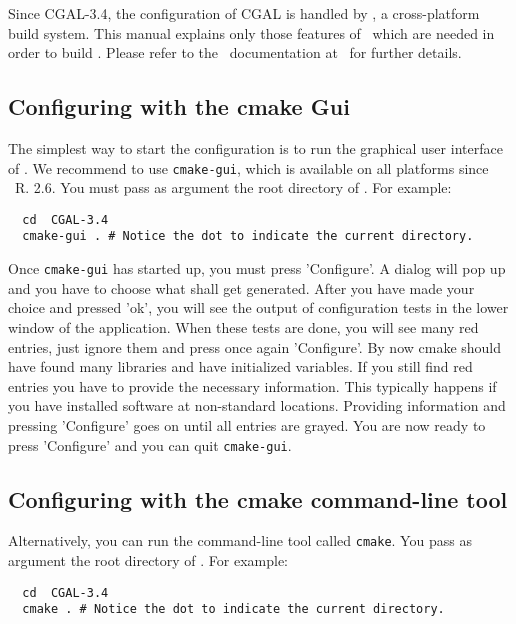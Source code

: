 Since CGAL-3.4, the configuration of CGAL is handled by \cmake, a
cross-platform build system.  This manual explains only those features of
\cmake\ which are needed in order to build \cgal. Please refer to the \cmake\ 
documentation at \cmakepage\ for further details.


\subsection{Configuring \cgal{} with the cmake {\sc Gui} }

The simplest way to start the configuration is to run the graphical
user interface of \cmake. We recommend to use \texttt{cmake-gui}, which
is available on all platforms since \cmake\ R. 2.6.   You must pass as 
argument the root directory of \cgal. For example:

{\ccTexHtml{\scriptsize}{}
\begin{verbatim}
  cd  CGAL-3.4
  cmake-gui . # Notice the dot to indicate the current directory.
\end{verbatim}
}

Once \texttt{cmake-gui} has started up, you must press 'Configure'. 
A dialog will pop up and you have to choose what shall get generated.
After you have made your choice and pressed 'ok', you will see
the output of configuration tests in the lower window of the application. 
When these tests are done, you will see many
red entries, just ignore them and  press once again  'Configure'. 
By now cmake should have found many libraries and have initialized variables. 
If you still find red entries you have to provide the necessary information. 
This typically happens if you have installed software at non-standard locations.
Providing information and pressing 'Configure' goes on until 
all entries are grayed. You are now ready to press 'Configure' and you
can quit \texttt{cmake-gui}.

 

\subsection{Configuring \cgal{} with the cmake command-line tool }

Alternatively, you can run the command-line tool called
\texttt{cmake}. You pass as argument the root directory of
\cgal. For example:

{\ccTexHtml{\scriptsize}{}
\begin{verbatim}
  cd  CGAL-3.4
  cmake . # Notice the dot to indicate the current directory.
\end{verbatim}
}



